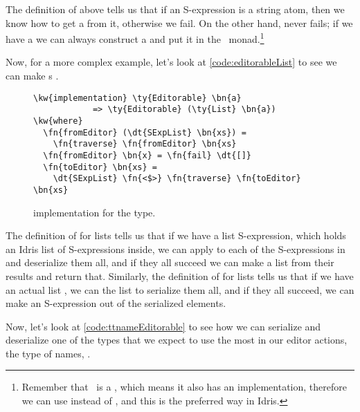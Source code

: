 The definition of  above tells us that if an S-expression is a
string atom, then we know how to get a  from it, otherwise we fail.
On the other hand,  never fails; if we have a  we can
always construct a  and put it in the
\Elab\ monad.\footnote{Remember that \Editorable\ is a , which means
it also has an  implementation, therefore we can use 
instead of , and this is the preferred way in Idris.}

Now, for a more complex example, let's look at \autoref{code:editorableList} to
see we can make s .

\begin{figure}[ht]
  \caption{ implementation for the  type.}
  \label{code:editorableList}
\begin{Verbatim}[framesep=2mm, label=\footnotesize{\normalfont{Idris}}, labelposition=topline]
\kw{implementation} \ty{Editorable} \bn{a}
            => \ty{Editorable} (\ty{List} \bn{a}) \kw{where}
  \fn{fromEditor} (\dt{SExpList} \bn{xs}) =
    \fn{traverse} \fn{fromEditor} \bn{xs}
  \fn{fromEditor} \bn{x} = \fn{fail} \dt{[]}
  \fn{toEditor} \bn{xs} =
    \dt{SExpList} \fn{<$>} \fn{traverse} \fn{toEditor} \bn{xs}
\end{Verbatim}
\end{figure}

The definition of  for lists tells us that if we have a list
S-expression, which holds an Idris list  of
S-expressions inside, we can apply  to each of the S-expressions
in  and deserialize them all, and if they all succeed we can make a list
from their results and return that.
Similarly, the definition of  for lists tells us that if we have an
actual list , we can  the list to serialize them all, and
if they all succeed, we can make an S-expression out of the serialized
elements.

Now, let's look at \autoref{code:ttnameEditorable} to see how we can serialize and
deserialize one of the types that we expect to use the most in our editor
actions, the type of names, .


